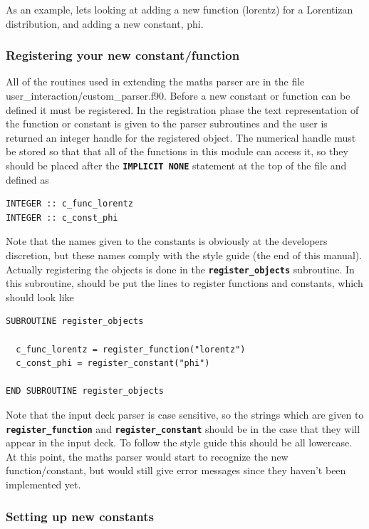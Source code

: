 \documentclass[12pt,a4paper]{article}
\newcommand{\simpleboxverbatim}{\begin{Verbatim}[obeytabs=true,frame=single,
  framerule=0.5mm,rulecolor=\color{warwickmid},formatcom=\color{black}]}
\newcommand{\inlinecode}[1]{{\color{warwickred} \bf\texttt{#1}}}
\newcommand{\EPOCH}{{\color{warwickdark}\fontfamily{phv}\selectfont{EPOCH}}}
\begin{document}
As an example, lets looking at adding a new function (lorentz) for a
Lorentizan distribution, and adding a new constant, phi.

\subsubsection{Registering your new constant/function}
All of the routines used in extending the maths parser are in the file
user\_interaction/custom\_parser.f90.  Before a new constant or function
can be defined it must be registered. In the registration phase the text
representation of the function or constant is given to the parser subroutines
and the user is returned an integer handle for the registered object. The
numerical handle must be stored so that that all of the functions in this
module can access it, so they should be placed after the \inlinecode{IMPLICIT
NONE} statement at the top of the file and defined as

\simpleboxverbatim
INTEGER :: c_func_lorentz
INTEGER :: c_const_phi
\end{Verbatim}

Note that the names given to the constants is obviously at the developers
discretion, but these names comply with the {\EPOCH} style guide (the end of
this manual). Actually registering the objects is done in the
\inlinecode{register\_objects} subroutine. In this subroutine, should be put the
lines to register functions and constants, which should look like

\simpleboxverbatim
SUBROUTINE register_objects

  c_func_lorentz = register_function("lorentz")
  c_const_phi = register_constant("phi")

END SUBROUTINE register_objects
\end{Verbatim}

Note that the input deck parser is case sensitive, so the strings which are
given to \inlinecode{register\_function} and \inlinecode{register\_constant}
should be in the case that they will appear in the input deck. To follow the
{\EPOCH} style guide this should be all lowercase. At this point, the maths
parser would start to recognize the new function/constant, but would still
give error messages since they haven't been implemented yet.

\subsubsection{Setting up new constants}
\end{document}
